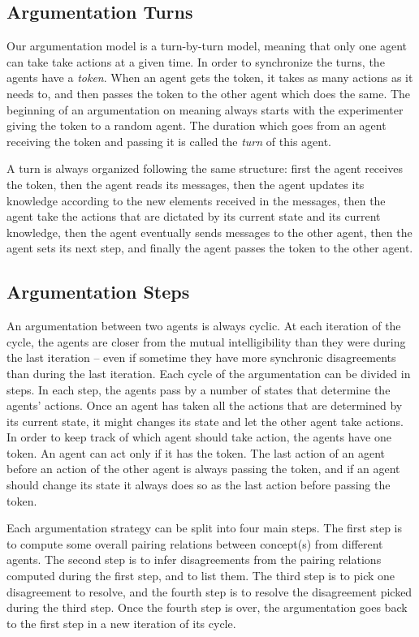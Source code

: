 \subsection{Argumentation Turns}
\label{sec:ArgTurns}

Our argumentation model is a turn-by-turn model, meaning that only one agent can take take actions at a given time. In order to synchronize the turns, the agents have a \emph{token}. When an agent gets the token, it takes as many actions as it needs to, and then passes the token to the other agent which does the same. The beginning of an argumentation on meaning always starts with the experimenter giving the token to a random agent. The duration which goes from an agent receiving the token and passing it is called the \emph{turn} of this agent.

A turn is always organized following the same structure: first the agent receives the token, then the agent reads its messages, then the agent updates its knowledge according to the new elements received in the messages, then the agent take the actions that are dictated by its current state and its current knowledge, then the agent eventually sends messages to the other agent, then the agent sets its next step, and finally the agent passes the token to the other agent.

\subsection{Argumentation Steps}
\label{sec:ArgSteps}

An argumentation between two agents is always cyclic. At each iteration of the cycle, the agents are closer from the mutual intelligibility than they were during the last iteration -- even if sometime they have more synchronic disagreements than during the last iteration. Each cycle of the argumentation can be divided in steps. In each step, the agents pass by a number of states that determine the agents' actions. Once an agent has taken all the actions that are determined by its current state, it might changes its state and let the other agent take actions. In order to keep track of which agent should take action, the agents have one token. An agent can act only if it has the token. The last action of an agent before an action of the other agent is always passing the token, and if an agent should change its state it always does so as the last action before passing the token.

Each argumentation strategy can be split into four main steps. The first step is to compute some overall pairing relations between concept(s) from different agents. The second step is to infer disagreements from the pairing relations computed during the first step, and to list them. The third step is to pick one disagreement to resolve, and the fourth step is to resolve the disagreement picked during the third step. Once the fourth step is over, the argumentation goes back to the first step in a new iteration of its cycle.

